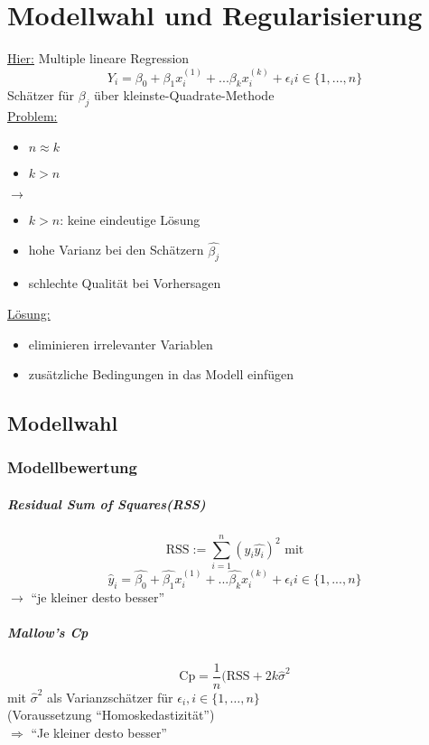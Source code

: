\chapter{Modellwahl und Regularisierung}
\underline{Hier:} Multiple lineare Regression 
\[ Y_{i} = \beta_{0} + \beta_{1} x_{i}^{(1)} + ... \beta_{k} x_{i}^{(k)} + \epsilon_{i} i \in \{ 1,...,n \} \]
Schätzer für $\beta_{j}$ über kleinste-Quadrate-Methode\\
\underline{Problem:}
\begin{itemize}
 \item $n \approx k$
 \item $k > n$
\end{itemize}
$\rightarrow$ 
\begin{itemize}
 \item $k > n$: keine eindeutige Lösung
 \item hohe Varianz bei den Schätzern $\widehat{\beta_j}$
 \item schlechte Qualität bei Vorhersagen
\end{itemize}

\underline{Lösung:}
\begin{itemize}
 \item eliminieren irrelevanter Variablen
 \item zusätzliche Bedingungen in das Modell einfügen
\end{itemize}

\section{Modellwahl}
\subsection{Modellbewertung}
\paragraph{Residual Sum of Squares(RSS)}
\[ \text{RSS}:= \sum\limits_{i=1}^{n} (y_i \hat{y_i})^2 \text{ mit} \]
\[ \hat{y}_i =  \hat{\beta_{0}} + \hat{\beta_{1}} x_{i}^{(1)} + ... \hat{\beta_{k}} x_{i}^{(k)} + \epsilon_{i} i \in \{ 1,...,n \} \]
$\rightarrow$ ``je kleiner desto besser''

\paragraph{Mallow's Cp}
\[ \text{Cp}= \frac{1}{n}(\text{RSS} + 2k \hat{\sigma}^{2} \]
mit $\hat{\sigma}^{2}$ als Varianzschätzer für $\epsilon_i , i \in \{1,\dots,n\}$ \\
(Voraussetzung ``Homoskedastizität'')\\
$\Rightarrow$ ``Je kleiner desto besser''
